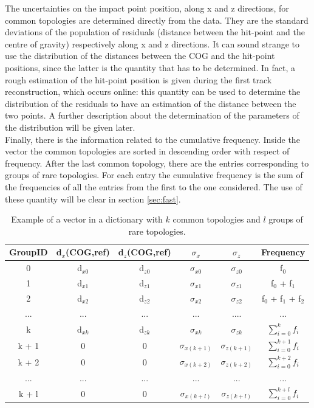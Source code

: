 The uncertainties on the impact point position, along x and z directions, for common topologies are determined directly from the data. They are the standard deviations of the population of residuals (distance between the hit-point and the centre of gravity) respectively along x and z directions. It can sound strange to use the distribution of the distances between the COG and the hit-point positions, since the latter is the quantity that has to be determined. In fact, a rough estimation of the hit-point position is given during the first track reconstruction, which occurs online: this quantity can be used to determine the distribution of the residuals to have an estimation of the distance between the two points. A further description about the determination of the parameters of the distribution will be given later.\\
Finally, there is the information related to the cumulative frequency. Inside the vector the common topologies are sorted in descending order with respect of frequency. After the last common topology, there are the entries corresponding to groups of rare topologies. For each entry the cumulative frequency is the sum of the frequencies of all the entries from the first to the one considered. The use of these quantity will be clear in section \ref{sec:fast}.
%
\begin{table}
\centering
\renewcommand\arraystretch{1.5}
 \begin{tabular}{|c|c|c|c|c|c|}
  \hline
  GroupID & d$_x$(COG,ref) & d$_z$(COG,ref) & $\sigma_x$ & $\sigma_z$ & Frequency\\
  \hline
  0 & d$_{x0}$ & d$_{z0}$ & $\sigma_{x0}$ & $\sigma_{z0}$ & f$_0$\\
  1 & d$_{x1}$ & d$_{z1}$ & $\sigma_{x1}$ & $\sigma_{z1}$ & f$_0$ + f$_1$\\
  2 & d$_{x2}$ & d$_{z2}$ & $\sigma_{x2}$ & $\sigma_{z2}$ & f$_0$ + f$_1$ + f$_2$\\
  ... & ... & ... & ... & .... & ... \\
  k & d$_{xk}$ & d$_{zk}$ & $\sigma_{xk}$ & $\sigma_{zk}$ & $\sum_{i=0}^{k} f_i$ \\
  k + 1 & 0 & 0 & $\sigma_{x(k+1)}$ & $\sigma_{z(k+1)}$ & $\sum_{i=0}^{k+1} f_i$\\
  k + 2 & 0 & 0 & $\sigma_{x(k+2)}$ & $\sigma_{z(k+2)}$ & $\sum_{i=0}^{k+2} f_i$\\
  ... & ... & ... & ... & ... & ...\\
  k + l & 0 & 0 & $\sigma_{x(k+l)}$ & $\sigma_{z(k+l)}$ & $\sum_{i=0}^{k+l} f_i$\\
  \hline
 \end{tabular}
 \caption{Example of a vector in a dictionary with $k$ common topologies and $l$ groups of rare topologies.}
 \label{tab:vec}
\end{table}
%
